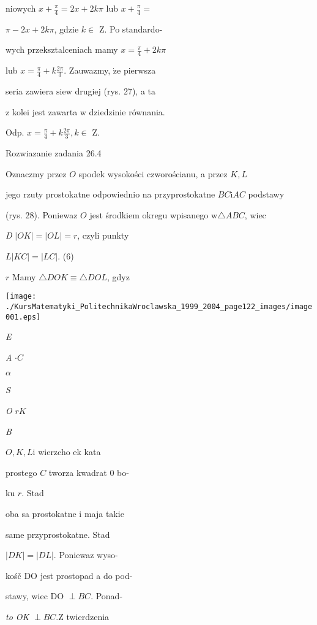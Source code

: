\documentclass[a4paper,12pt]{article}
\begin{document}
niowych $x+\displaystyle \frac{\pi}{4} =  2x+2k\pi$ lub $x+\displaystyle \frac{\pi}{4} =$

$\pi-2x+2k\pi$, gdzie $k \in$ Z. Po standardo-

wych przeksztalceniach mamy $x= \displaystyle \frac{\pi}{4}+2k\pi$

lub $x = \displaystyle \frac{\pi}{4}+k\frac{2\pi}{3}$. Zauwazmy, $\dot{\mathrm{z}}\mathrm{e}$ pierwsza

seria zawiera $\mathrm{s}\mathrm{i}\mathrm{e} \mathrm{w}$ drugiej (rys. 27), a ta

$\mathrm{z}$ kolei jest zawarta $\mathrm{w}$ dziedzinie równania.

Odp. $x=\displaystyle \frac{\pi}{4}+k\frac{2\pi}{3},  k\in$ Z.

Rozwiazanie zadania 26.4

Oznaczmy przez $O$ spodek wysokości czworościanu, a przez $K, L$

jego rzuty prostokatne odpowiednio na przyprostokatne $BC\mathrm{i}AC$ podstawy

(rys. 28). Poniewaz $O$ jest środkiem okregu wpisanego $\mathrm{w} \triangle ABC$, wiec

{\it D} $|OK| = |OL| = r$, czyli punkty

$L |KC|=|LC|$.   (6)

$r$ Mamy $\triangle DOK \equiv \triangle DOL$, gdyz
\begin{center}
\texttt{[image: ./KursMatematyki\_PolitechnikaWroclawska\_1999\_2004\_page122\_images/image001.eps]}
\end{center}
{\it E}

{\it A} $\cdot C$

$\alpha$

{\it S}

{\it O} $r K$

{\it B}

$O, K, L \mathrm{i}$ wierzcho ek kata

prostego $C$ tworza kwadrat $0$ bo-

ku $r$. Stad

oba sa prostokatne $\mathrm{i}$ maja takie

same przyprostokatne. Stad

$|DK| = |DL|$. Poniewaz wyso-

kośč DO jest prostopad a do pod-

stawy, wiec DO $\perp BC$. Ponad-

{\it to OK} $\perp BC. \mathrm{Z}$ twierdzenia
\end{document}
